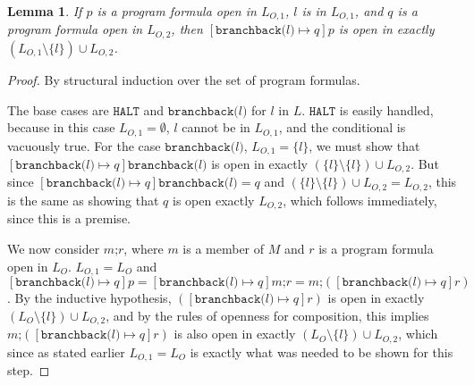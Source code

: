 \documentclass[11pt]{article}
\begin{document}
\newtheorem*{substopenness}{Lemma}
\begin{substopenness}
If $p$ is a program formula open in $L_{O,1}$, $l$ is in $L_{O,1}$, and $q$ is a program formula open in $L_{O,2}$, then $[\texttt{branchback(}l\texttt{)} \mapsto q]p$ is open in exactly $(L_{O,1} \setminus \{l\}) \cup L_{O,2}$.
\end{substopenness}
\begin{proof}
By structural induction over the set of program formulas.

The base cases are $\texttt{HALT}$ and $\texttt{branchback(}l\texttt{)}$ for $l$ in $L$. $\texttt{HALT}$ is easily handled, because in this case $L_{O,1} = \emptyset$, $l$ cannot be in $L_{O,1}$, and the conditional is vacuously true.  For the case $\texttt{branchback(}l\texttt{)}$, $L_{O,1} = \{l\}$, we must show that $[\texttt{branchback(}l\texttt{)} \mapsto q]\texttt{branchback(}l\texttt{)}$ is open in exactly $(\{l\} \setminus \{l\}) \cup L_{O,2}$.  But since $[\texttt{branchback(}l\texttt{)} \mapsto q]\texttt{branchback(}l\texttt{)} = q$ and $(\{l\} \setminus \{l\}) \cup L_{O,2} = L_{O,2}$, this is the same as showing that $q$ is open exactly $L_{O,2}$, which follows immediately, since this is a premise.

We now consider $m\texttt{;}r$, where $m$ is a member of $M$ and $r$ is a program formula open in $L_{O}$.  $L_{O,1} = L_{O}$ and $[\texttt{branchback(}l\texttt{)} \mapsto q]p = [\texttt{branchback(}l\texttt{)} \mapsto q]m\texttt{;}r = m\texttt{;}([\texttt{branchback(}l\texttt{)} \mapsto q]r)$.  By the inductive hypothesis, $([\texttt{branchback(}l\texttt{)} \mapsto q]r)$ is open in exactly $(L_{O} \setminus \{l\}) \cup L_{O,2}$, and by the rules of openness for composition, this implies $m\texttt{;}([\texttt{branchback(}l\texttt{)} \mapsto q]r)$ is also open in exactly $(L_{O} \setminus \{l\}) \cup L_{O,2}$, which since as stated earlier $L_{O,1} = L_{O}$ is exactly what was needed to be shown for this step.


\end{proof}
\end{document}
